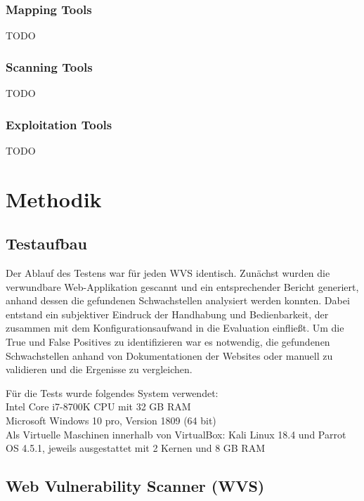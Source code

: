 \documentclass[12pt,oneside,a4paper,parskip]{scrbook}
\begin{document}
    \subsection{Mapping Tools}
    TODO
    \subsection{Scanning Tools}
    TODO
    \subsection{Exploitation Tools}
    TODO

\chapter{Methodik}
  \section{Testaufbau}
  Der Ablauf des Testens war für jeden WVS identisch.
  Zunächst wurden die verwundbare Web-Applikation gescannt und ein entsprechender Bericht generiert, anhand dessen die gefundenen Schwachstellen analysiert werden konnten. Dabei entstand ein subjektiver Eindruck der Handhabung und Bedienbarkeit, der zusammen mit dem Konfigurationsaufwand in die Evaluation einfließt. Um die True und False Positives zu identifizieren war es notwendig, die gefundenen Schwachstellen anhand von Dokumentationen der Websites oder manuell zu validieren und die Ergenisse zu vergleichen.

  Für die Tests wurde folgendes System verwendet:
  \\Intel Core i7-8700K CPU mit 32 GB RAM
  \\Microsoft Windows 10 pro, Version 1809 (64 bit)
  \\Als Virtuelle Maschinen innerhalb von VirtualBox: Kali Linux 18.4 und Parrot OS 4.5.1, jeweils ausgestattet mit 2 Kernen und 8 GB RAM

\section{Web Vulnerability Scanner (WVS)}
\end{document}
